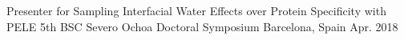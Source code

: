 

\begin{cventries}

  \cventry
    {Presenter for Sampling Interfacial Water Effects over Protein Specificity with PELE} %
    {5th BSC Severo Ochoa Doctoral Symposium} %
    {Barcelona, Spain} %
    {Apr. 2018} %
    {~}

\end{cventries}
